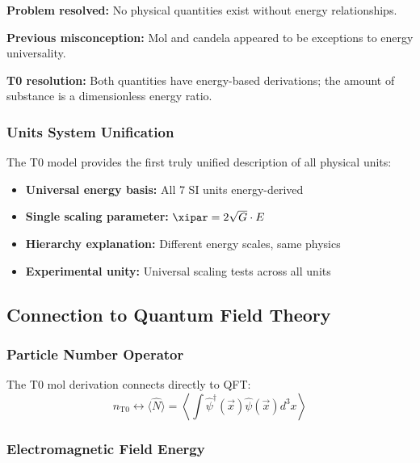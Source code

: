 \textbf{Problem resolved:} No physical quantities exist without energy relationships.

\textbf{Previous misconception:} Mol and candela appeared to be exceptions to energy universality.

\textbf{T0 resolution:} Both quantities have energy-based derivations; the amount of substance is a dimensionless energy ratio.

\subsubsection{Units System Unification}
\label{subsubsec:units_system_unification}

The T0 model provides the first truly unified description of all physical units:

\begin{itemize}
	\item \textbf{Universal energy basis:} All 7 SI units energy-derived
	\item \textbf{Single scaling parameter:} $\xipar = 2\sqrt{G} \cdot E$
	\item \textbf{Hierarchy explanation:} Different energy scales, same physics
	\item \textbf{Experimental unity:} Universal scaling tests across all units
\end{itemize}

\subsection{Connection to Quantum Field Theory}
\label{subsec:qft_connection}

\subsubsection{Particle Number Operator}
\label{subsubsec:particle_number_operator}

The T0 mol derivation connects directly to QFT:
\begin{equation}
	n_{\text{T0}} \leftrightarrow \langle \hat{N} \rangle = \left\langle \int \hat{\psi}^\dagger(\vec{x}) \hat{\psi}(\vec{x}) d^3x \right\rangle
	\label{eq:mol_qft_connection}
\end{equation}

\subsubsection{Electromagnetic Field Energy}
\label{subsubsec:em_field_energy}

